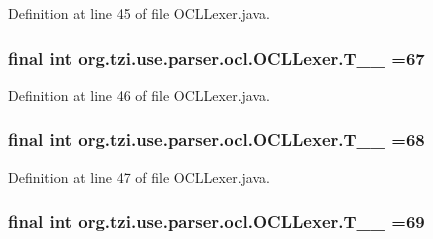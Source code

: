 Definition at line 45 of file O\-C\-L\-Lexer.\-java.

\hypertarget{classorg_1_1tzi_1_1use_1_1parser_1_1ocl_1_1_o_c_l_lexer_ad41d2eddf7953def9d18802810b93246}{
\subsubsection[{T\-\_\-\-\_\-67}]{\setlength{\rightskip}{0pt plus 5cm}final int org.\-tzi.\-use.\-parser.\-ocl.\-O\-C\-L\-Lexer.\-T\-\_\-\-\_ =67\hspace{0.3cm}{\ttfamily [static]}}}\label{classorg_1_1tzi_1_1use_1_1parser_1_1ocl_1_1_o_c_l_lexer_ad41d2eddf7953def9d18802810b93246}


Definition at line 46 of file O\-C\-L\-Lexer.\-java.

\hypertarget{classorg_1_1tzi_1_1use_1_1parser_1_1ocl_1_1_o_c_l_lexer_af801fad13e126f461529370446c294f4}{
\subsubsection[{T\-\_\-\-\_\-68}]{\setlength{\rightskip}{0pt plus 5cm}final int org.\-tzi.\-use.\-parser.\-ocl.\-O\-C\-L\-Lexer.\-T\-\_\-\-\_ =68\hspace{0.3cm}{\ttfamily [static]}}}\label{classorg_1_1tzi_1_1use_1_1parser_1_1ocl_1_1_o_c_l_lexer_af801fad13e126f461529370446c294f4}


Definition at line 47 of file O\-C\-L\-Lexer.\-java.

\hypertarget{classorg_1_1tzi_1_1use_1_1parser_1_1ocl_1_1_o_c_l_lexer_a0c0dbf6bae038d1c90935923a09c3b81}{
\subsubsection[{T\-\_\-\-\_\-69}]{\setlength{\rightskip}{0pt plus 5cm}final int org.\-tzi.\-use.\-parser.\-ocl.\-O\-C\-L\-Lexer.\-T\-\_\-\-\_ =69\hspace{0.3cm}{\ttfamily [static]}}}\label{classorg_1_1tzi_1_1use_1_1parser_1_1ocl_1_1_o_c_l_lexer_a0c0dbf6bae038d1c90935923a09c3b81}


